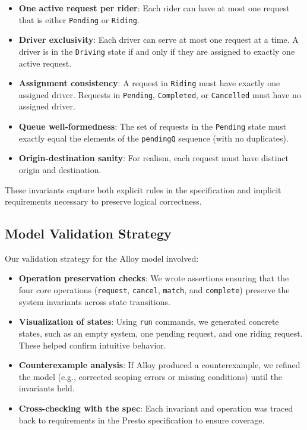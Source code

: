 \documentclass[11pt]{article}
\begin{document}
\begin{itemize}[leftmargin=1.5em]
  \item \textbf{One active request per rider}: Each rider can have at most one request that is either \texttt{Pending} or \texttt{Riding}.
  \item \textbf{Driver exclusivity}: Each driver can serve at most one request at a time. A driver is in the \texttt{Driving} state if and only if they are assigned to exactly one active request.
  \item \textbf{Assignment consistency}: A request in \texttt{Riding} must have exactly one assigned driver. Requests in \texttt{Pending}, \texttt{Completed}, or \texttt{Cancelled} must have no assigned driver.
  \item \textbf{Queue well-formedness}: The set of requests in the \texttt{Pending} state must exactly equal the elements of the \texttt{pendingQ} sequence (with no duplicates).
  \item \textbf{Origin-destination sanity}: For realism, each request must have distinct origin and destination.
\end{itemize}
These invariants capture both explicit rules in the specification and implicit requirements necessary to preserve logical correctness.

\subsection{Model Validation Strategy}

Our validation strategy for the Alloy model involved:
\begin{itemize}[leftmargin=1.5em]
  \item \textbf{Operation preservation checks}: We wrote assertions ensuring that the four core operations (\texttt{request}, \texttt{cancel}, \texttt{match}, and \texttt{complete}) preserve the system invariants across state transitions.
  \item \textbf{Visualization of states}: Using \texttt{run} commands, we generated concrete states, such as an empty system, one pending request, and one riding request. These helped confirm intuitive behavior.
  \item \textbf{Counterexample analysis}: If Alloy produced a counterexample, we refined the model (e.g., corrected scoping errors or missing conditions) until the invariants held.
  \item \textbf{Cross-checking with the spec}: Each invariant and operation was traced back to requirements in the Presto specification to ensure coverage.
\end{itemize}
\end{document}
